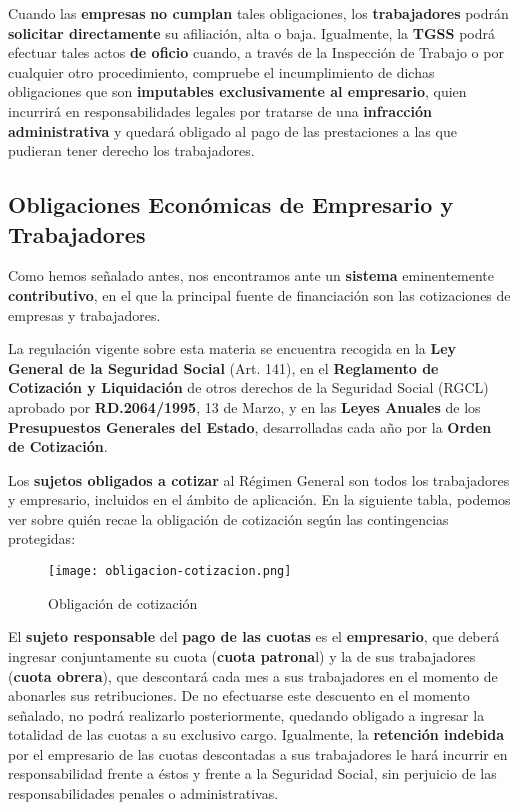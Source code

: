 Cuando las \textbf{empresas} \textbf{no cumplan} tales obligaciones, los \textbf{trabajadores} podrán \textbf{solicitar directamente} su afiliación, alta o baja. Igualmente, la \textbf{TGSS} podrá efectuar tales actos \textbf{de oficio} cuando, a través de la Inspección de Trabajo o por cualquier otro procedimiento, compruebe el incumplimiento de dichas obligaciones que son \textbf{imputables exclusivamente al empresario}, quien incurrirá en responsabilidades legales por tratarse de una \textbf{infracción administrativa} y quedará obligado al pago de las prestaciones a las que pudieran tener derecho los trabajadores.

\subsection{Obligaciones Económicas de Empresario y Trabajadores}
Como hemos señalado antes, nos encontramos ante un \textbf{sistema} eminentemente \textbf{contributivo}, en el que la principal fuente de financiación son las cotizaciones de empresas y trabajadores.

La regulación vigente sobre esta materia se encuentra recogida en la \textbf{Ley General de la Seguridad Social} (Art. 141), en el \textbf{Reglamento de Cotización y Liquidación} de otros derechos de la Seguridad Social (RGCL) aprobado por \textbf{RD.2064/1995}, 13 de Marzo, y en las \textbf{Leyes Anuales} de los \textbf{Presupuestos Generales del Estado}, desarrolladas cada año por la \textbf{Orden de Cotización}.

Los \textbf{sujetos obligados a cotizar} al Régimen General son todos los trabajadores y empresario, incluidos en el ámbito de aplicación. En la siguiente tabla, podemos ver sobre quién recae la obligación de cotización según las contingencias protegidas:

\begin{figure}[H]
    \centering
    \texttt{[image: obligacion-cotizacion.png]}
    \caption{Obligación de cotización}
\end{figure}

El \textbf{sujeto responsable} del \textbf{pago de las cuotas} es el \textbf{empresario}, que deberá ingresar conjuntamente su cuota (\textbf{cuota patrona}l) y la de sus trabajadores (\textbf{cuota obrera}), que descontará cada mes a sus trabajadores en el momento de abonarles sus retribuciones. De no efectuarse este descuento en el momento señalado, no podrá realizarlo posteriormente, quedando obligado a ingresar la totalidad de las cuotas a su exclusivo cargo. Igualmente, la \textbf{retención indebida} por el empresario de las cuotas descontadas a sus trabajadores  le hará incurrir en responsabilidad frente a éstos y frente a la Seguridad Social, sin perjuicio de las responsabilidades penales o administrativas.

